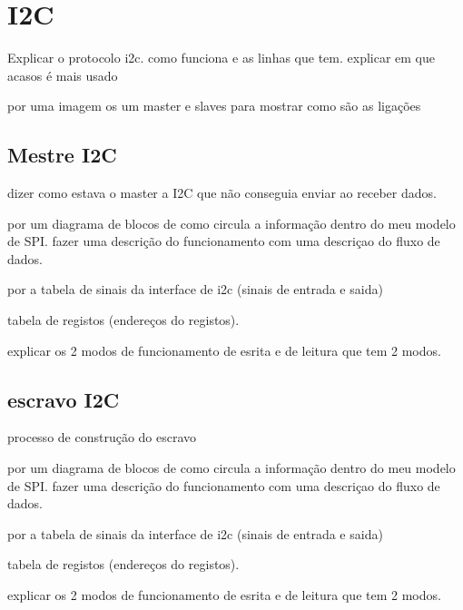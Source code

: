 
\chapter{I2C}
\label{chapter:i2c}


Explicar o protocolo i2c. como funciona e as linhas que tem. explicar em que acasos é mais usado

por uma imagem os um master e slaves para mostrar como s\~ao as liga\c{c}ões

\section{Mestre I2C}

dizer como estava o master a I2C que n\~ao conseguia enviar ao receber dados.

por um diagrama de blocos de como circula a informa\c{c}\~ao dentro do meu modelo de SPI. fazer uma descri\c{c}\~ao do funcionamento com uma descri\c{c}ao do fluxo de dados.

por a tabela de sinais da interface de i2c (sinais de entrada e saida)

tabela de registos (endere\c{c}os do registos).

explicar os 2 modos de funcionamento de esrita e de leitura que tem 2 modos.

\section{escravo I2C}

processo de constru\c{c}\~ao do escravo 

por um diagrama de blocos de como circula a informa\c{c}\~ao dentro do meu modelo de SPI. fazer uma descri\c{c}\~ao do funcionamento com uma descri\c{c}ao do fluxo de dados.

por a tabela de sinais da interface de i2c (sinais de entrada e saida)

tabela de registos (endere\c{c}os do registos).

explicar os 2 modos de funcionamento de esrita e de leitura que tem 2 modos.
